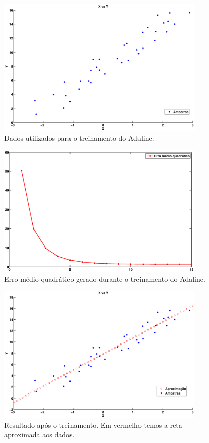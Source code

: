 \documentclass[12pt,journal,onecolumn]{IEEEtran}
\begin{document}
\begin{figure}[!htbp]
	\centering
	\includegraphics[width=10cm, trim = 3cm 1cm 3cm 1cm, clip=true]
	{eps/adaline/amostras.eps}
	\caption{Dados utilizados para o treinamento do Adaline.}
	\label{fig:regressao} 
\end{figure}

\begin{figure}[!htbp]
	\centering
	\includegraphics[width=10cm, trim = 3cm 1cm 3cm 1cm, clip=true]
	{eps/adaline/erro.eps}
	\caption{Erro médio quadrático gerado durante o treinamento do Adaline.}
	\label{fig:regressaoErro} 
\end{figure} 

\begin{figure}[!htbp]
	\centering
	\includegraphics[width=10cm, trim = 3cm 1cm 3cm 1cm, clip=true]
	{eps/adaline/resultado.eps}
	\caption{Resultado após o treinamento. Em vermelho temos a reta aproximada aos
	dados.}
	\label{fig:regressaoResultado} 
\end{figure} 
\end{document}
